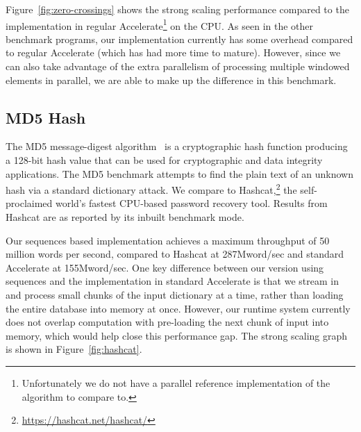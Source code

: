 Figure~\ref{fig:zero-crossings} shows the strong scaling performance compared to
the implementation in regular Accelerate\footnote{Unfortunately we do not have a
parallel reference implementation of the algorithm to compare to.} on the CPU\@.
As seen in the other benchmark programs, our implementation currently has some
overhead compared to regular Accelerate (which has had more time to mature).
However, since we can also take advantage of the extra parallelism of processing
multiple windowed elements in parallel, we are able to make up the difference in
this benchmark.




\subsection{MD5 Hash}

The MD5 message-digest algorithm~\cite{Rivest:MD5} is a cryptographic hash
function producing a 128-bit hash value that can be used for cryptographic and
data integrity applications. The MD5 benchmark attempts to find the plain text
of an unknown hash via a standard dictionary attack.
%
%
We compare to Hashcat,\footnote{\url{https://hashcat.net/hashcat/}} the
self-proclaimed world's fastest CPU-based password recovery tool. Results from
Hashcat are as reported by its inbuilt benchmark mode.

Our sequences based implementation achieves a maximum throughput of 50 million
words per second, compared to Hashcat at 287Mword/sec and standard Accelerate at
155Mword/sec. One key difference between our version using sequences and the
implementation in standard Accelerate is that we stream in and process small
chunks of the input dictionary at a time, rather than loading the entire
database into memory at once. However, our runtime system currently does not
overlap computation with pre-loading the next chunk of input into memory, which
would help close this performance gap. The strong scaling graph is shown in
Figure~\ref{fig:hashcat}.


